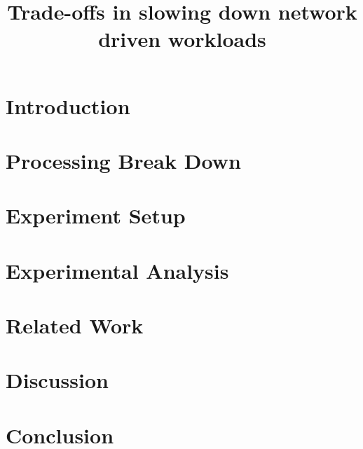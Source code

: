 \documentclass[sigplan,10pt]{acmart}
\begin{document}
\title{Trade-offs in slowing down network driven workloads}


\maketitle
\pagestyle{plain} %

\section{Introduction}


\section{Processing Break Down}



\section{Experiment Setup}


\section{Experimental Analysis}





\section{Related Work}


\section{Discussion}


\section{Conclusion}




\appendix

\end{document}

